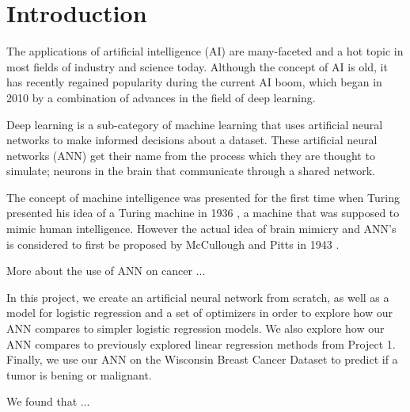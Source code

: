 \section{Introduction}\label{sec:introduction}


The applications of artificial intelligence (AI) are many-faceted and a hot topic in most fields
of industry and science today. Although the concept of AI is old, it has recently regained popularity during the current AI boom, 
which began in 2010 by a combination of advances in the field of deep learning. 

Deep learning is a sub-category of machine learning that uses 
artificial neural networks to make informed decisions about a dataset. These artificial neural networks (ANN) get their name from 
the process which they are thought to simulate; neurons in the brain that communicate through a shared network. 

The concept of machine intelligence was presented for the first time when Turing presented his idea of 
a Turing machine in 1936 \cite{turing_36}, a machine that was supposed to mimic human intelligence. However the actual idea of brain mimicry and ANN's is considered to first be proposed by McCullough and Pitts in 1943 \cite{mccu_pitt}.

More about the use of ANN on cancer ...

In this project, we create an artificial neural network from scratch, as well as a model for logistic regression and a set of optimizers 
in order to explore how our ANN compares to simpler logistic regression models. We also explore how our ANN compares to previously 
explored linear regression methods from Project 1. Finally, we use our ANN on the Wisconsin Breast Cancer Dataset to predict if a
tumor is bening or malignant. 

We found that ...

